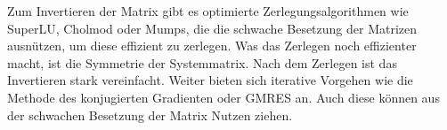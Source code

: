 Zum Invertieren der Matrix gibt es optimierte Zerlegungsalgorithmen wie SuperLU, Cholmod oder Mumps, die die schwache Besetzung der Matrizen ausnützen, um diese effizient zu zerlegen.
Was das Zerlegen noch effizienter macht, ist die Symmetrie der Systemmatrix.
Nach dem Zerlegen ist das Invertieren stark vereinfacht.
Weiter bieten sich iterative Vorgehen wie die Methode des konjugierten Gradienten oder GMRES an.
Auch diese können aus der schwachen Besetzung der Matrix Nutzen ziehen.
